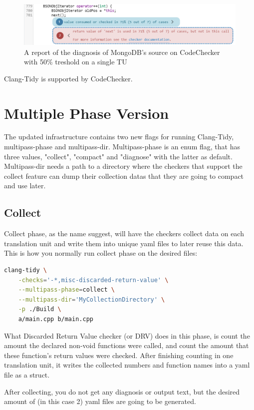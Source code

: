 \begin{figure}
	\label{fig:mongo50single}
	\includegraphics[width=\linewidth]{images/codechecker_first_ss_mongo_single_50.png}
	\caption{A report of the diagnosis of MongoDB's source on CodeChecker with 50\% treshold on a single TU}
\end{figure}

Clang-Tidy is supported by CodeChecker. \cite{codechecker}

\section{Multiple Phase Version}

The updated infrastructure contains two new flags for running Clang-Tidy, multipass-phase and multipass-dir.
Multipass-phase is an enum flag, that has three values, "collect", "compact" and "diagnose" with the latter as default.
Multipass-dir needs a path to a directory where the checkers that support the collect feature can dump their collection datas
that they are going to compact and use later.

\subsection{Collect}

Collect phase, as the name suggest, will have the checkers collect data on each translation unit and write them into unique yaml
files to later reuse this data. This is how you normally run collect phase on the desired files:

\begin{lstlisting}[language={bash}]
	clang-tidy \
	-checks='-*,misc-discarded-return-value' \
	--multipass-phase=collect \
	--multipass-dir='MyCollectionDirectory' \
	-p ./Build \
	a/main.cpp b/main.cpp
\end{lstlisting}

What Discarded Return Value checker (or DRV) does in this phase, is count the amount the declared non-void functions were called,
and count the amount that these function's return values were checked. After finishing counting in one translation unit, it writes the
collected numbers and function names into a yaml file as a struct.  
\par After collecting, you do not get any diagnosis or output text, but the desired amount of (in this case 2) yaml files are going to
be generated.

